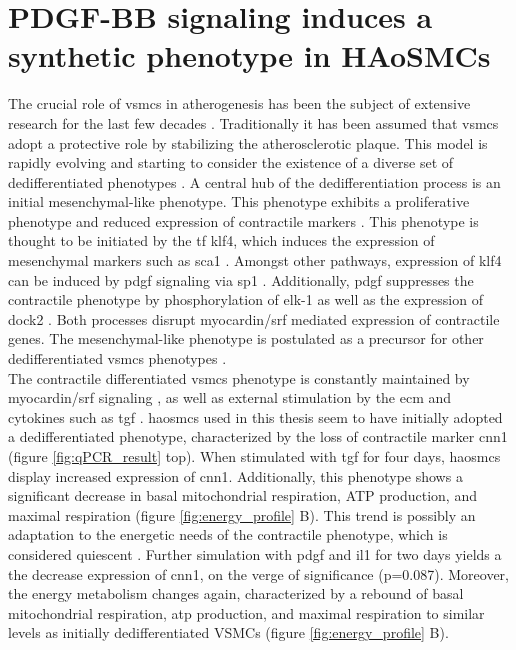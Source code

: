 \section{PDGF-BB signaling induces a synthetic phenotype in HAoSMCs}
The crucial role of \acp{vsmc} in atherogenesis has been the subject of extensive research for the last few decades \cite{grootaertVascularSmoothMuscle2021, yapSixShadesVascular2021}. Traditionally it has been assumed that \acp{vsmc} adopt a protective role by stabilizing the atherosclerotic plaque. This model is rapidly evolving and starting to consider the existence of a diverse set of dedifferentiated phenotypes \cite{liuSmoothMuscleCell2019}. A central hub of the dedifferentiation process is an initial mesenchymal-like phenotype. This phenotype exhibits a proliferative phenotype and reduced expression of contractile markers \cite{yapSixShadesVascular2021}. This phenotype is thought to be initiated by the \ac{tf} \ac{klf4}, which induces the expression of mesenchymal markers such as \ac{sca1} \cite{yapSixShadesVascular2021}. Amongst other pathways, expression of \ac{klf4} can be induced by \ac{pdgf} signaling \cite{liuKruppellikeFactorAbrogates2005} via \ac{sp1} \cite{deatonSp1dependentActivationKLF42009}. Additionally, \ac{pdgf} suppresses the contractile phenotype by phosphorylation of \ac{elk-1} \cite{wangMyocardinTernaryComplex2004} as well as the expression of \ac{dock2} \cite{guoDedicatorCytokinesisNovel2015}. Both processes disrupt myocardin/\ac{srf} mediated expression of contractile genes. The mesenchymal-like phenotype is postulated as a precursor for other dedifferentiated \acp{vsmc} phenotypes \cite{yapSixShadesVascular2021}.\\
The contractile differentiated \acp{vsmc} phenotype is constantly maintained by myocardin/\ac{srf} signaling \cite{longMyocardinSufficientSmooth2008}, as well as external stimulation by the \ac{ecm} and cytokines such as \ac{tgf} \cite{davis-dusenberyDownregulationKruppellikeFactor42011}. \acp{haosmc} used in this thesis seem to have initially adopted a dedifferentiated phenotype, characterized by the loss of contractile marker \ac{cnn1} \cite{owensMolecularRegulationVascular2004} (figure \ref{fig:qPCR_result} top). When stimulated with \ac{tgf} for four days, \acp{haosmc} display increased expression of \ac{cnn1}. Additionally, this phenotype shows a significant decrease in  basal mitochondrial respiration, ATP production, and maximal respiration (figure \ref{fig:energy_profile} B). This trend is possibly an adaptation to the energetic needs of the contractile phenotype, which is considered quiescent \cite{dobnikarDiseaserelevantTranscriptionalSignatures2018}. Further simulation with \ac{pdgf} and \ac{il1} for two days yields a the decrease expression of \ac{cnn1}, on the verge of significance (p=0.087). Moreover, the energy metabolism changes again, characterized by a rebound of basal mitochondrial respiration, \ac{atp} production, and maximal respiration to similar levels as initially dedifferentiated VSMCs (figure \ref{fig:energy_profile} B).\\

